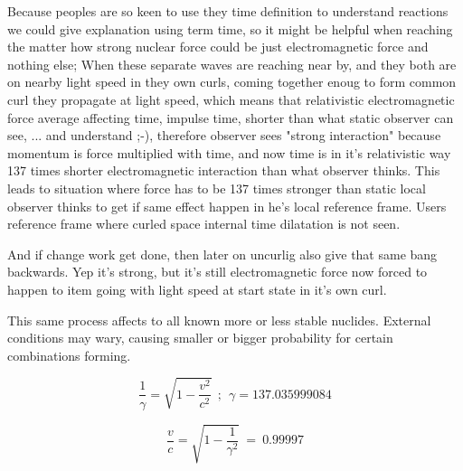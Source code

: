 Because peoples are so keen to use they time definition to understand reactions
we could give explanation using term time, so it might be helpful when reaching
the matter how strong nuclear force could be just electromagnetic force and
nothing else; When these separate waves are reaching near by, and they both are
on nearby light speed in they own curls, coming together enoug to form common
curl they propagate at light speed, which means that relativistic
electromagnetic force average affecting time, impulse time, shorter than what
static observer can see, ... and understand ;-), therefore observer sees "strong
interaction" because momentum is force multiplied with time, and now time is in
it's relativistic way 137\cite{FineStructureConst} times shorter electromagnetic
interaction than what observer thinks. This leads to situation where force has
to be 137 times stronger than static local observer thinks to get if same effect
happen in he's local reference frame. Users reference frame where curled space
internal time dilatation\cite{TimeDilation} is not seen.

And if change work get done, then later on uncurlig also give that same bang
backwards. Yep it's strong, but it's still electromagnetic force now forced to
happen to item going with light speed at start state in it's own curl.

This same process affects to all known more or less stable nuclides\cite{Nuclides}.
External conditions may wary, causing smaller or bigger probability for certain
combinations forming.

\begin{equation} \label{eq:clock_rate} %
 \frac{1}{\gamma}=\sqrt{1-\frac{v^2}{c^2}}~~;~~\gamma=137.035999084
\end{equation}




\begin{equation} \label{eq:speed}
	\frac{v}{c}=\sqrt{1-\frac{1}{\gamma^2}} ~=~ 0.99997
\end{equation}

